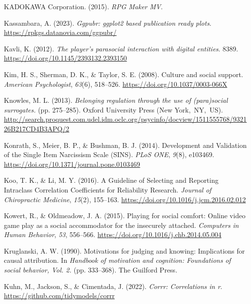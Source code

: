 \documentclass[
]{udthesis}
\newlength{\cslhangindent}
\newenvironment{CSLReferences}[2] %
 {\begin{list}{}{%
  \setlength{\itemindent}{0pt}
  \setlength{\leftmargin}{0pt}
  \setlength{\parsep}{0pt}
  \ifodd #1
   \setlength{\leftmargin}{\cslhangindent}
   \setlength{\itemindent}{-1\cslhangindent}
  \fi
  \setlength{\itemsep}{#2\baselineskip}}}
 {\end{list}}
\begin{document}
\begin{CSLReferences}{1}{0}
KADOKAWA Corporation. (2015). \emph{{RPG Maker MV}}.

Kassambara, A. (2023). \emph{Ggpubr: ggplot2 based publication ready plots}. \url{https://rpkgs.datanovia.com/ggpubr/}

Kavli, K. (2012). \emph{The player's parasocial interaction with digital entities}. 8389. \url{https://doi.org/10.1145/2393132.2393150}

Kim, H. S., Sherman, D. K., \& Taylor, S. E. (2008). Culture and social support. \emph{American Psychologist}, \emph{63}(6), 518--526. \url{https://doi.org/10.1037/0003-066X}

Knowles, M. L. (2013). \emph{Belonging regulation through the use of (para)social surrogates.} (pp. 275--285). {Oxford University Press (New York,~NY,~US)}. \url{http://search.proquest.com.udel.idm.oclc.org/psycinfo/docview/1511555768/932126B217CD4B3APQ/2}

Konrath, S., Meier, B. P., \& Bushman, B. J. (2014). Development and {Validation} of the {Single Item Narcissism Scale} ({SINS}). \emph{PLoS ONE}, \emph{9}(8), e103469. \url{https://doi.org/10.1371/journal.pone.0103469}

Koo, T. K., \& Li, M. Y. (2016). A {Guideline} of {Selecting} and {Reporting Intraclass Correlation Coefficients} for {Reliability Research}. \emph{Journal of Chiropractic Medicine}, \emph{15}(2), 155--163. \url{https://doi.org/10.1016/j.jcm.2016.02.012}

Kowert, R., \& Oldmeadow, J. A. (2015). Playing for social comfort: Online video game play as a social accommodator for the insecurely attached. \emph{Computers in Human Behavior}, \emph{53}, 556--566. \url{https://doi.org/10.1016/j.chb.2014.05.004}

Kruglanski, A. W. (1990). Motivations for judging and knowing: {Implications} for causal attribution. In \emph{Handbook of motivation and cognition: {Foundations} of social behavior, {Vol}. 2.} (pp. 333--368). {The Guilford Press}.

Kuhn, M., Jackson, S., \& Cimentada, J. (2022). \emph{Corrr: Correlations in r}. \url{https://github.com/tidymodels/corrr}


\end{CSLReferences}
\end{document}
